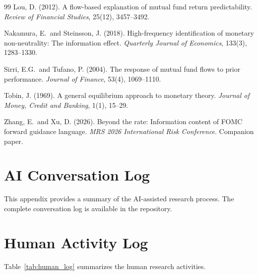 \documentclass[11pt,a4paper]{article}
\begin{document}
\begin{thebibliography}{99}
Lou, D. (2012). A flow-based explanation of mutual fund return predictability. \textit{Review of Financial Studies}, 25(12), 3457--3492.

Nakamura, E.\ and Steinsson, J. (2018). High-frequency identification of monetary non-neutrality: The information effect. \textit{Quarterly Journal of Economics}, 133(3), 1283--1330.

Sirri, E.G.\ and Tufano, P. (2004). The response of mutual fund flows to prior performance. \textit{Journal of Finance}, 53(4), 1069--1110.

Tobin, J. (1969). A general equilibrium approach to monetary theory. \textit{Journal of Money, Credit and Banking}, 1(1), 15--29.

Zhang, E.\ and Xu, D. (2026). Beyond the rate: Information content of FOMC forward guidance language. \textit{MRS 2026 International Risk Conference}. Companion paper.

\end{thebibliography}

\newpage
\appendix

\section{AI Conversation Log}
\label{app:ai_log}

This appendix provides a summary of the AI-assisted research process. The complete conversation log is available in the repository.

\section{Human Activity Log}
\label{app:human_log}

Table~\ref{tab:human_log} summarizes the human research activities.
\end{document}
